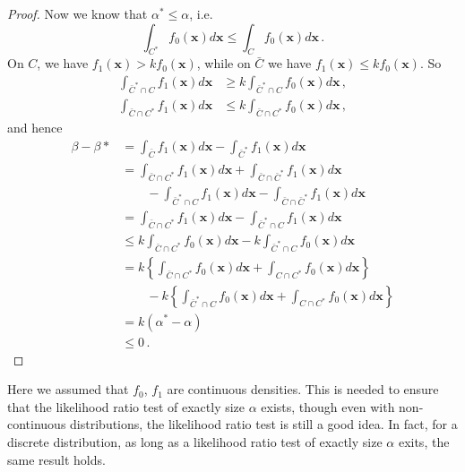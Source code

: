 \documentclass[a4paper,11pt]{article}
\theoremstyle{definition}
\numberwithin{equation}{section}
\begin{document}
\begin{proof}
Now we know that $\alpha^*\leq\alpha$, i.e.
\[
\int_{C^*}f_0(\mathbf{x})d\mathbf{x}\leq\int_Cf_0(\mathbf{x})d\mathbf{x}\,.
\]
On $C$, we have $f_1(\mathbf{x})>kf_0(\mathbf{x})$, while on $\bar{C}$ we have $f_1(\mathbf{x})\leq kf_0(\mathbf{x})$. So
\begin{align*}
    \int_{\bar{C}^*\cap C}f_1(\mathbf{x})d\mathbf{x}&\geq k\int_{\bar{C}^*\cap C}f_0(\mathbf{x})d\mathbf{x}\,,\\
    \int_{\bar{C}\cap C^*}f_1(\mathbf{x})d\mathbf{x}&\leq k\int_{\bar{C}\cap C^*} f_0(\mathbf{x})d\mathbf{x}\,,
\end{align*}
and hence
\begin{align*}
    \beta-\beta*&=\int_{\bar{C}}f_1(\mathbf{x})d\mathbf{x}-\int_{\bar{C}^*}f_1(\mathbf{x})d\mathbf{x}\\
    &=\int_{\bar{C}\cap C^*}f_1(\mathbf{x})d\mathbf{x} + \int_{\bar{C}\cap \bar{C}^*}f_1(\mathbf{x})d\mathbf{x}\\
    &\qquad-\int_{\bar{C}^*\cap C}f_1(\mathbf{x})d\mathbf{x}-\int_{\bar{C}\cap\bar{C}^*}f_1(\mathbf{x})d\mathbf{x}\\
    &=\int_{\bar{C}\cap C^*}f_1(\mathbf{x})d\mathbf{x}-\int_{\bar{C}^*\cap C}f_1(\mathbf{x})d\mathbf{x}\\
    &\leq k\int_{\bar{C}\cap C^*}f_0(\mathbf{x})d\mathbf{x}-k\int_{\bar{C}^*\cap C}f_0(\mathbf{x})d\mathbf{x}\\
    &=k\left\{\int_{\bar{C}\cap C^*}f_0(\mathbf{x})d\mathbf{x}+\int_{C\cap C^*}f_0(\mathbf{x})d\mathbf{x}\right\}\\
    &\qquad-k\left\{\int_{\bar{C}^*\cap C}f_0(\mathbf{x})d\mathbf{x}+\int_{C\cap C^*}f_0(\mathbf{x})d\mathbf{x}\right\}\\
    &=k(\alpha^*-\alpha)\\
    &\leq0\,.
\end{align*}
\end{proof}

Here we assumed that $f_0$, $f_1$ are continuous densities. This is needed to ensure that the likelihood ratio test of exactly size $\alpha$ exists, though even with non-continuous distributions, the likelihood ratio test is still a good idea. In fact, for a discrete distribution, as long as a likelihood ratio test of exactly size $\alpha$ exits, the same result holds.
\end{document}
